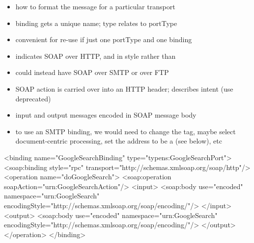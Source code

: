 \documentclass{sepslide-soa-faked} %
\begin{document}
\begin{slide}

	\begin{itemize}
	\item how to format the message for a particular transport
	\item binding gets a unique name; type relates to portType
	\item convenient for re-use if just one portType and one binding
	\item {} indicates SOAP over HTTP, 
		and in  style rather than 
	\item could instead have SOAP over SMTP or over FTP
	\item SOAP action is carried over into an HTTP header; describes intent
		(use deprecated)
	\item input and output messages encoded in SOAP message body
	\item to use an SMTP binding, we would need to change the  tag, maybe select document-centric processing, set the address to be
a  (see below), etc
	\end{itemize}
\end{slide}
\begin{slide}
\begin{xml}
  <binding name="GoogleSearchBinding" type="typens:GoogleSearchPort">
    <soap:binding style="rpc"
      transport="http://schemas.xmlsoap.org/soap/http"/>
    <operation name="doGoogleSearch">
      <soap:operation soapAction="urn:GoogleSearchAction"/>
      <input>
        <soap:body use="encoded"
          namespace="urn:GoogleSearch"
          encodingStyle="http://schemas.xmlsoap.org/soap/encoding/"/>
      </input>
      <output>
        <soap:body use="encoded"
          namespace="urn:GoogleSearch"
          encodingStyle="http://schemas.xmlsoap.org/soap/encoding/"/>
      </output>
    </operation>
  </binding>
\end{xml}
\end{slide}
\end{document}
